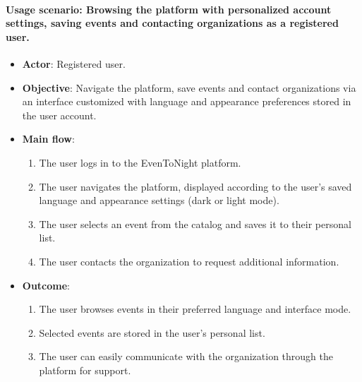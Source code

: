 \paragraph{Usage scenario: Browsing the platform with personalized account settings, saving events and contacting organizations as a registered user.}
\begin{itemize}
  \item \textbf{Actor}: Registered user.
  \item \textbf{Objective}: Navigate the platform, save events and contact organizations via an interface customized with language and appearance preferences stored in the user account.
  \item \textbf{Main flow}:
    \begin{enumerate}
      \item The user logs in to the EvenToNight platform.
      \item The user navigates the platform, displayed according to the user's saved language and appearance settings (dark or light mode).
      \item The user selects an event from the catalog and saves it to their personal list.
      \item The user contacts the organization to request additional information.
    \end{enumerate}
  \item \textbf{Outcome}:
    \begin{enumerate}
      \item The user browses events in their preferred language and interface mode.
      \item Selected events are stored in the user's personal list.
      \item The user can easily communicate with the organization through the platform for support.
    \end{enumerate}
\end{itemize}

